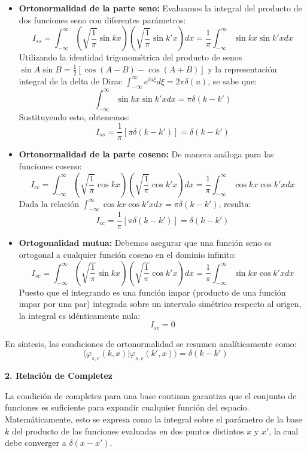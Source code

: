\documentclass[a4paper]{article}
\begin{document}
\begin{itemize}
    \item \textbf{Ortonormalidad de la parte seno:}
    Evaluamos la integral del producto de dos funciones seno con diferentes parámetros:
    $$ I_{ss} = \int_{-\infty}^{\infty} \left( \sqrt{\frac{1}{\pi}} \sin kx \right) \left( \sqrt{\frac{1}{\pi}} \sin k'x \right) dx = \frac{1}{\pi} \int_{-\infty}^{\infty} \sin kx \sin k'x dx $$
    Utilizando la identidad trigonométrica del producto de senos $\sin A \sin B = \frac{1}{2} [\cos(A-B) - \cos(A+B)]$ y la representación integral de la delta de Dirac $\int_{-\infty}^{\infty} e^{iu\xi} d\xi = 2\pi \delta(u)$, se sabe que:
    $$ \int_{-\infty}^{\infty} \sin kx \sin k'x dx = \pi \delta(k - k') $$
    Sustituyendo esto, obtenemos:
    $$ I_{ss} = \frac{1}{\pi} [\pi \delta(k - k')] = \delta(k - k') $$

    \item \textbf{Ortonormalidad de la parte coseno:}
    De manera análoga para las funciones coseno:
    $$ I_{cc} = \int_{-\infty}^{\infty} \left( \sqrt{\frac{1}{\pi}} \cos kx \right) \left( \sqrt{\frac{1}{\pi}} \cos k'x \right) dx = \frac{1}{\pi} \int_{-\infty}^{\infty} \cos kx \cos k'x dx $$
    Dada la relación $\int_{-\infty}^{\infty} \cos kx \cos k'x dx = \pi \delta(k - k')$, resulta:
    $$ I_{cc} = \frac{1}{\pi} [\pi \delta(k - k')] = \delta(k - k') $$

    \item \textbf{Ortogonalidad mutua:}
    Debemos asegurar que una función seno es ortogonal a cualquier función coseno en el dominio infinito:
    $$ I_{sc} = \int_{-\infty}^{\infty} \left( \sqrt{\frac{1}{\pi}} \sin kx \right) \left( \sqrt{\frac{1}{\pi}} \cos k'x \right) dx = \frac{1}{\pi} \int_{-\infty}^{\infty} \sin kx \cos k'x dx $$
    Puesto que el integrando es una función impar (producto de una función impar por una par) integrada sobre un intervalo simétrico respecto al origen, la integral es idénticamente nula:
    $$ I_{sc} = 0 $$
\end{itemize}

En síntesis, las condiciones de ortonormalidad se resumen analíticamente como:
$$ \langle \varphi_{s,c}(k, x) | \varphi_{s,c}(k', x) \rangle = \delta(k - k') $$

\textbf{2. Relación de Completez}

La condición de completez para una base continua garantiza que el conjunto de funciones es suficiente para expandir cualquier función del espacio. Matemáticamente, esto se expresa como la integral sobre el parámetro de la base $k$ del producto de las funciones evaluadas en dos puntos distintos $x$ y $x'$, la cual debe converger a $\delta(x - x')$. 
\end{document}
